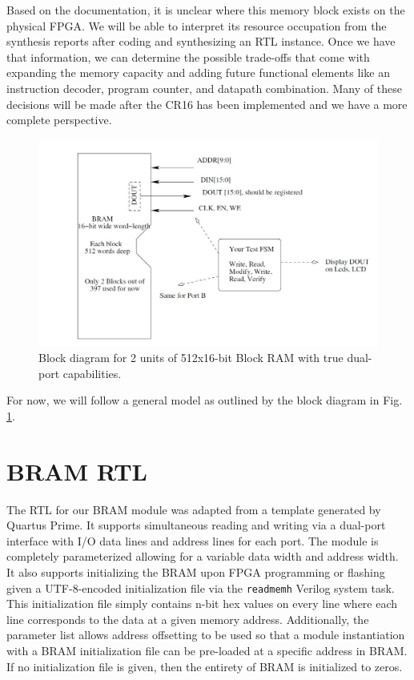 \documentclass[conference]{IEEEtran}
\begin{document}
 Based on the documentation, it is unclear where this memory block exists on the physical FPGA. We will be able to interpret its resource occupation from the synthesis reports after coding and synthesizing an RTL instance. Once we have that information, we can determine the possible trade-offs that come with expanding the memory capacity and adding future functional elements like an instruction decoder, program counter, and datapath combination. Many of these decisions will be made after the CR16 has been implemented and we have a more complete perspective.

 \begin{figure}
     \centering
     \includegraphics[scale=0.6]{resources/figures/block_diagram_bram.jpg}
     \caption{Block diagram for 2 units of 512x16-bit Block RAM with true dual-port capabilities.}
     \label{fig:block_diagram}
 \end{figure}

For now, we will follow a general model as outlined by the block diagram in Fig. \ref{fig:block_diagram}.

\section{BRAM RTL}
The RTL for our BRAM module was adapted from a template generated by Quartus Prime. It supports simultaneous reading and writing via a dual-port interface with I/O data lines and address lines for each port. The module is completely parameterized allowing for a variable data width and address width. It also supports initializing the BRAM upon FPGA programming or flashing given a UTF-8-encoded initialization file via the \verb|readmemh| Verilog system task. This initialization file simply contains n-bit hex values on every line where each line corresponds to the data at a given memory address. Additionally, the parameter list allows address offsetting to be used so that a module instantiation with a BRAM initialization file can be pre-loaded at a specific address in BRAM. If no initialization file is given, then the entirety of BRAM is initialized to zeros.
\end{document}
